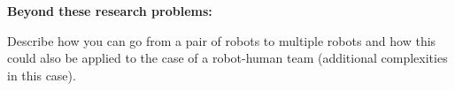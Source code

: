 \documentclass[12pt]{article}
\newcommand{\kostas}[1]{{\color{blue} #1}}
\begin{document}
\kostas {
  {\bf Beyond these research problems:}

  Describe how you can go from a pair of robots to multiple robots and
  how this could also be applied to the case of a robot-human team
  (additional complexities in this case). 

}



\newpage

\small{}

\end{document}
